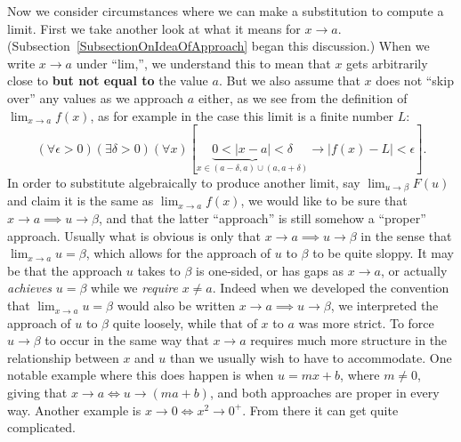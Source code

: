 Now we consider circumstances where we can make a substitution
to compute a limit.  First we take another look at
what it means for $x\to a$. 
(Subsection~\ref{SubsectionOnIdeaOfApproach} began this discussion.)
When we write $x\to a$ under ``lim,'', we understand this to mean that 
$x$ gets arbitrarily close to {\bf but not equal to} the
value $a$.  But we also assume that $x$ does not
``skip over'' any values as we approach $a$ either, as we 
see from the definition of $\lim_{x\to a}f(x)$,
as for example in the case this limit is a finite number $L$:
$$(\forall\epsilon>0)(\exists\delta>0)
  (\forall x)[\underbrace{0<|x-a|<\delta}_{x\in(a-\delta,a)\cup(a,a+\delta)}
\longrightarrow|f(x)-L|<\epsilon].$$
In order to substitute algebraically to produce
another limit, say ${\lim_{u\to\beta}F(u)}$
and claim it is the same as ${\lim_{x\to a}f(x)}$,
we would like to be sure that
$x\to a\implies u\to\beta$, and that the latter ``approach''
is still somehow a ``proper'' approach.  
Usually what is obvious is only that
$x\to a\implies u\to \beta$ in the
sense that $\lim_{x\to a}u=\beta$, which allows for the approach
of $u$ to $\beta$ to be quite sloppy.
It may be that the approach
$u$ takes to $\beta$ is one-sided, or has gaps as $x\to a$,
or actually {\it achieves} $u=\beta$ while we {\it require}
$x\ne a$.  Indeed when we developed the convention
that $\lim_{x\to a}u=\beta$ would also be written
$x\to a\implies u\to\beta$, we interpreted the approach
of $u$ to $\beta$ quite loosely, while
that of $x$ to $a$ was more strict.
To force $u\to\beta$ to occur  in the same way that
$x\to a$ requires much more structure in the relationship 
between $x$ and $u$ than we usually wish  to have to
accommodate.  One notable example where this does happen
is when $u=mx+b$, where $m\ne0$, giving that $x\to a\iff u\to(ma+b)$,
and both approaches are proper in every way.  Another example
is $x\to0\iff x^2\to0^+$. From there it can get quite complicated.

